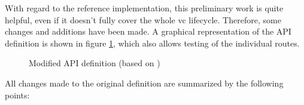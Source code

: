     With regard to the reference implementation, this preliminary work is quite helpful, even if it doesn't fully cover the whole \ac{vc} lifecycle. Therefore, some changes and additions have been made. A graphical representation of the API definition is shown in figure \ref{figure: api definition}, which also allows testing of the individual routes.
    \newpage
    \begin{figure}[ht]
        \centering
        \caption{Modified API definition (based on \cite{world_wide_web_consortium_credentials_community_group_vc_2021})}
        \label{figure: api definition}
    \end{figure}
    
    All changes made to the original definition are summarized by the following points:
    
